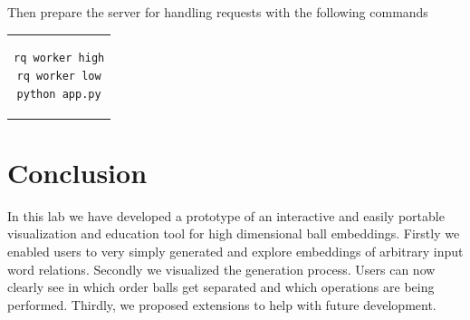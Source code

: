\documentclass[]{article}
\begin{document}
Then prepare the server for handling requests with the following commands

\begin{center}
\begin{tabular}{c}
\begin{lstlisting}
rq worker high
rq worker low
python app.py
\end{lstlisting}
\end{tabular}
\end{center}


\section{Conclusion}
In this lab we have developed a prototype of an interactive and easily portable visualization and education tool for high dimensional ball embeddings. Firstly we enabled users to very simply generated and explore embeddings of arbitrary input word relations. Secondly we visualized the generation process. Users can now clearly see in which order balls get separated and which operations are being performed. Thirdly, we proposed extensions to help with future development. 





	
	
	
	 
\end{document}
